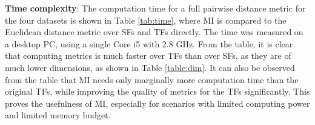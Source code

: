 \textbf{Time complexity}: The computation time for a full pairwise distance metric for the
four datasets is shown in Table \ref{tab:time}, where MI is compared to the Euclidean distance
metric over SFs and TFs directly. The time was measured
on a desktop PC, using a single Core i5 with 2.8 GHz. From the table, it is clear
that computing metrics is much faster over TFs than over SFs, as they
are of much lower dimensions, as shown in Table \ref{table:dim}. It can
also be observed from the table that MI needs only marginally more
computation time than the original TFs, while improving the quality
of metrics for the TFs significantly. This proves the usefulness of
MI, especially for scenarios with limited computing power and limited
memory budget.






